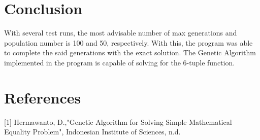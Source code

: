 \documentclass{acm_proc_article-sp}
\begin{document}
\section{Conclusion}
With several test runs, the most advisable number of max generations and population number is 100 and 50, respectively. With this, the program was able to complete the said generations with the exact solution. The Genetic Algorithm implemented in the program is capable of solving for the 6-tuple function.

\section{References}
[1] Hermawanto, D.,"Genetic Algorithm for Solving Simple Mathematical Equality Problem", Indonesian Institute of Sciences, n.d.
\end{document}
